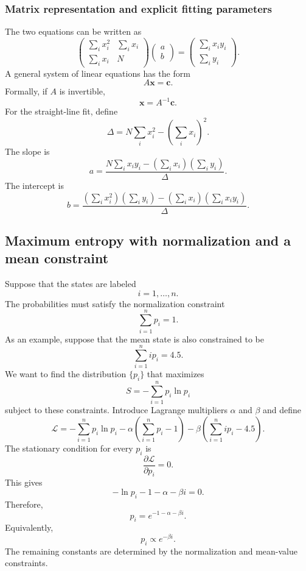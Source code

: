 \subsubsection{Matrix representation and explicit fitting parameters}
\label{deriv:fit-matrix}


The two equations can be written as
% 
\[
    \begin{pmatrix}
        \sum_i x_i^2 & \sum_i x_i \\
        \sum_i x_i & N
    \end{pmatrix}
    \begin{pmatrix}
        a \\
        b
    \end{pmatrix}
    =
    \begin{pmatrix}
        \sum_i x_i y_i \\
        \sum_i y_i
    \end{pmatrix}.
\]
% 
A general system of linear equations has the form
% 
\[
    A\mathbf{x}=\mathbf{c}.
\]
% 
Formally, if $A$ is invertible,
% 
\[
    \mathbf{x}=A^{-1}\mathbf{c}.
\]
% 
For the straight-line fit, define
% 
\[
    \Delta=N\sum_i x_i^2-\left(\sum_i x_i\right)^2.
\]
% 
The slope is
% 
\[
    \boxed{a=\frac{N\sum_i x_i y_i-\left(\sum_i x_i\right)\left(\sum_i y_i\right)}{\Delta}.}
\]
% 
The intercept is
% 
\[
    \boxed{b=\frac{\left(\sum_i x_i^2\right)\left(\sum_i y_i\right)-\left(\sum_i x_i\right)\left(\sum_i x_i y_i\right)}{\Delta}.}
\]
% 
% 

\subsection{Maximum entropy with normalization and a mean constraint}
\label{deriv:maxent}


Suppose that the states are labeled
% 
\[
    i=1,\ldots,n.
\]
% 
The probabilities must satisfy the normalization constraint
% 
\[
    \sum_{i=1}^{n}p_i=1.
\]
% 
As an example, suppose that the mean state is also constrained to be
% 
\[
    \sum_{i=1}^{n}ip_i=4.5.
\]
% 
We want to find the distribution $\{p_i\}$ that maximizes
% 
\[
    S=-\sum_{i=1}^{n}p_i\ln p_i
\]
% 
subject to these constraints.
% 
Introduce Lagrange multipliers $\alpha$ and $\beta$ and define
% 
\[
    \mathcal{L}=-\sum_{i=1}^{n}p_i\ln p_i-\alpha\left(\sum_{i=1}^{n}p_i-1\right)-\beta\left(\sum_{i=1}^{n}ip_i-4.5\right).
\]
% 
The stationary condition for every $p_i$ is
% 
\[
    \frac{\partial\mathcal{L}}{\partial p_i}=0.
\]
% 
This gives
% 
\[
    -\ln p_i-1-\alpha-\beta i=0.
\]
% 
Therefore,
% 
\[
    p_i=e^{-1-\alpha-\beta i}.
\]
% 
Equivalently,
% 
\[
    p_i\propto e^{-\beta i}.
\]
% 
The remaining constants are determined by the normalization and mean-value constraints.



